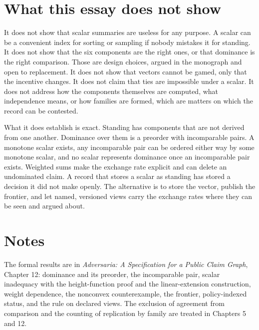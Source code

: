 \documentclass[11pt]{article}
\begin{document}
\section{What this essay does not show}\label{sec:limits}

It does not show that scalar summaries are useless for any purpose. A scalar can be a convenient index for sorting or sampling if nobody mistakes it for standing. It does not show that the six components are the right ones, or that dominance is the right comparison. Those are design choices, argued in the monograph and open to replacement. It does not show that vectors cannot be gamed, only that the incentive changes. It does not claim that ties are impossible under a scalar. It does not address how the components themselves are computed, what independence means, or how families are formed, which are matters on which the record can be contested.

What it does establish is exact. Standing has components that are not derived from one another. Dominance over them is a preorder with incomparable pairs. A monotone scalar exists, any incomparable pair can be ordered either way by some monotone scalar, and no scalar represents dominance once an incomparable pair exists. Weighted sums make the exchange rate explicit and can delete an undominated claim. A record that stores a scalar as standing has stored a decision it did not make openly. The alternative is to store the vector, publish the frontier, and let named, versioned views carry the exchange rates where they can be seen and argued about.

\section*{Notes}

The formal results are in \emph{Adversaria: A Specification for a Public Claim Graph}, Chapter 12: dominance and its preorder, the incomparable pair, scalar inadequacy with the height-function proof and the linear-extension construction, weight dependence, the nonconvex counterexample, the frontier, policy-indexed status, and the rule on declared views. The exclusion of agreement from comparison and the counting of replication by family are treated in Chapters 5 and 12.
\end{document}
